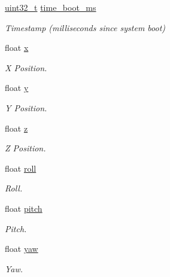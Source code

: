 \begin{DoxyCompactItemize}
\item 
\hyperlink{stdint_8h_a435d1572bf3f880d55459d9805097f62}{uint32\-\_\-t} \hyperlink{struct____mavlink__local__position__ned__system__global__offset__t_a7da6dfcadb9fe7e050d067ab139600c4}{time\-\_\-boot\-\_\-ms}
\begin{DoxyCompactList}\small\item\em Timestamp (milliseconds since system boot) \end{DoxyCompactList}\item 
float \hyperlink{struct____mavlink__local__position__ned__system__global__offset__t_a35ab546f47a443131ccd805126ae9ca1}{x}
\begin{DoxyCompactList}\small\item\em X Position. \end{DoxyCompactList}\item 
float \hyperlink{struct____mavlink__local__position__ned__system__global__offset__t_a475a296670eca737a98ff9c89f8289f8}{y}
\begin{DoxyCompactList}\small\item\em Y Position. \end{DoxyCompactList}\item 
float \hyperlink{struct____mavlink__local__position__ned__system__global__offset__t_a39ca4444559388d75cb066b14db24a4b}{z}
\begin{DoxyCompactList}\small\item\em Z Position. \end{DoxyCompactList}\item 
float \hyperlink{struct____mavlink__local__position__ned__system__global__offset__t_ad4d99c9821f0ee3d85c2a0eba615a8c8}{roll}
\begin{DoxyCompactList}\small\item\em Roll. \end{DoxyCompactList}\item 
float \hyperlink{struct____mavlink__local__position__ned__system__global__offset__t_abf94231c7acd5e41896e5fdf98cd0128}{pitch}
\begin{DoxyCompactList}\small\item\em Pitch. \end{DoxyCompactList}\item 
float \hyperlink{struct____mavlink__local__position__ned__system__global__offset__t_a2a919917ced7545167d6f588d6c8f0ef}{yaw}
\begin{DoxyCompactList}\small\item\em Yaw. \end{DoxyCompactList}\end{DoxyCompactItemize}


